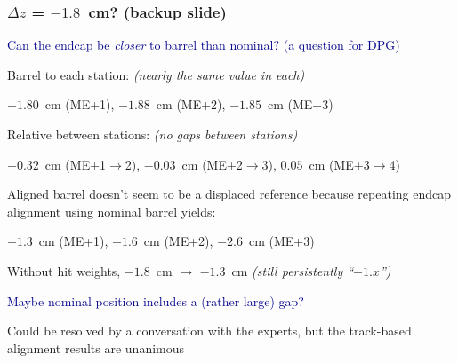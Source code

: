 \documentclass[compress]{beamer}
\begin{document}
\begin{frame}
\frametitle{$\Delta z$ = $-1.8$~cm? (backup slide)}
\small
\textcolor{darkblue}{Can the endcap be {\it closer} to barrel than nominal?  (a question for DPG)}

\vspace{0.3 cm}
Barrel to each station: \hfill {\it \scriptsize (nearly the same value in each)}
\begin{center}
$-1.80$~cm (ME+1), $-1.88$~cm (ME+2), $-1.85$~cm (ME+3)
\end{center}
Relative between stations: \hfill {\it \scriptsize (no gaps between stations)}
\begin{center}
$-0.32$~cm (ME+1$\to$2), $-0.03$~cm (ME+2$\to$3), $0.05$~cm (ME+3$\to$4)
\end{center}

\vspace{0.2 cm}
Aligned barrel doesn't seem to be a displaced reference because repeating endcap alignment using nominal barrel yields:
\begin{center}
$-1.3$~cm (ME+1), $-1.6$~cm (ME+2), $-2.6$~cm (ME+3)
\end{center}

\vspace{0.2 cm}
Without hit weights, $-1.8$~cm $\to$ $-1.3$~cm \hfill {\it \scriptsize (still persistently ``$-1.x$'')}

\vspace{0.3 cm}
\textcolor{darkblue}{Maybe nominal position includes a (rather large) gap?}

\vspace{0.2 cm}
Could be resolved by a conversation with the experts, but the track-based alignment results are unanimous
\end{frame}
\end{document}
